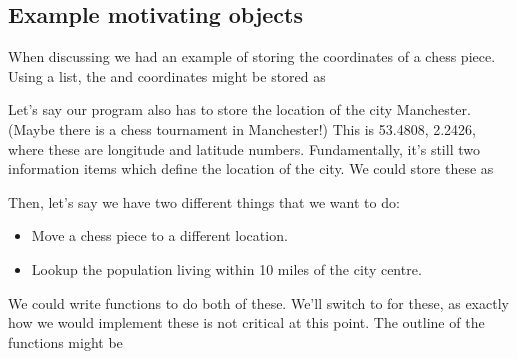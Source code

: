 \documentclass[letterpaper,10pt,british]{sphinxmanual}
\begin{document}
\subsection{Example motivating objects}
\label{\detokenize{chapters/programming_fundamentals/objects:example-motivating-objects}}
\sphinxAtStartPar
When discussing {\hyperref[\detokenize{chapters/programming_fundamentals/variables:variables}]{}} we had an example of storing the coordinates of a chess piece. Using a list, the  and  coordinates might be stored as

\begin{sphinxVerbatim}[commandchars=\\\{\}]
  \PYG{p}{[} \PYG{p}{]}
\end{sphinxVerbatim}

\sphinxAtStartPar
Let’s say our program also has to store the location of the city Manchester. (Maybe there is a chess tournament in Manchester!) This is 53.4808, \sphinxhyphen{}2.2426, where these are longitude and latitude numbers. Fundamentally, it’s still two information items which define the location of the city. We could store these as

\begin{sphinxVerbatim}[commandchars=\\\{\}]
  \PYG{p}{[} \PYG{p}{]}
\end{sphinxVerbatim}

\sphinxAtStartPar
Then, let’s say we have two different things that we want to do:
\begin{itemize}
\item {} 
\sphinxAtStartPar
Move a chess piece to a different location.

\item {} 
\sphinxAtStartPar
Lookup the population living within 10 miles of the city centre.

\end{itemize}

\sphinxAtStartPar
We could write functions to do both of these. We’ll switch to {\hyperref[\detokenize{chapters/software_development_tools/pseudocode:pseudocode}]{}} for these, as exactly how we would implement these is not critical at this point. The outline of the functions might be
\end{document}
